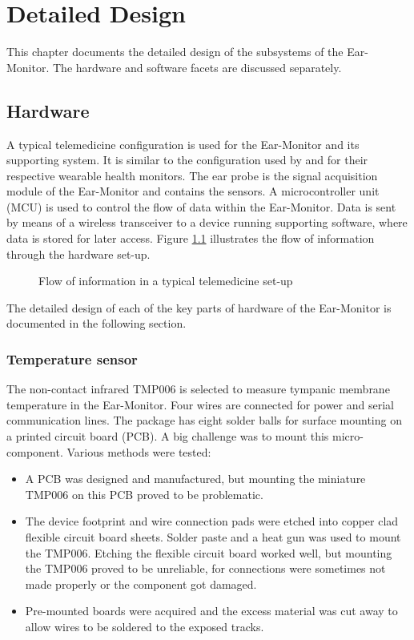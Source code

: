 \chapter{Detailed Design}
\label{chp:Detailed Design}
This chapter documents the detailed design of the subsystems of the Ear-Monitor. The hardware and software facets are discussed separately. 

\section{Hardware}

A typical telemedicine configuration is used for the Ear-Monitor and its supporting system. It is similar to the configuration used by \cite{wang2010wearable} and \cite{prawiro2016integrated} for their respective wearable health monitors. The ear probe is the signal acquisition module of the Ear-Monitor and contains the sensors. A microcontroller unit (MCU) is used to control the flow of data within the Ear-Monitor. Data is sent by means of a wireless transceiver to a device running supporting software, where data is stored for later access. Figure \ref{fig:HardwareFlowchart} illustrates the flow of information through the hardware set-up.

\begin{figure}[H]
\centering
\graphicspath{{figs/}}

\caption{Flow of information in a typical telemedicine set-up}
\label{fig:HardwareFlowchart}
\end{figure}

The detailed design of each of the key parts of hardware of the Ear-Monitor is documented in the following section.

\subsection{Temperature sensor}
The non-contact infrared TMP006 is selected to measure tympanic membrane temperature in the Ear-Monitor. Four wires are connected for power and serial communication lines. The package has eight solder balls for surface mounting on a printed circuit board (PCB). A big challenge was to mount this micro-component. Various methods were tested:

\begin{itemize}
\item A PCB was designed and manufactured, but mounting the miniature TMP006 on this PCB proved to be problematic.
\item The device footprint and wire connection pads were etched into copper clad flexible circuit board sheets. Solder paste and a heat gun was used to mount the TMP006. Etching the flexible circuit board worked well, but mounting the TMP006 proved to be unreliable, for connections were sometimes not made properly or the component got damaged.
\item Pre-mounted boards were acquired and the excess material was cut away to allow wires to be soldered to the exposed tracks.
\end{itemize}

